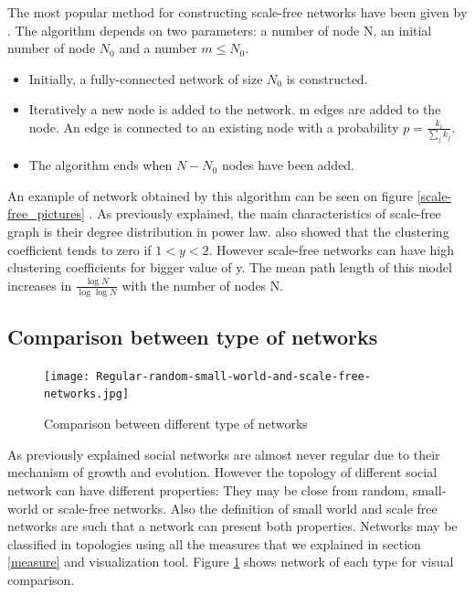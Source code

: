 \documentclass[a4paper, 12pt]{report}
\begin{document}
The most popular method for constructing scale-free networks have been given by \cite{barabasi_model}. The algorithm depends on two parameters: a number of node N, an initial number of node $N_0$ and a number $m \leq N_0$.\\
\begin{itemize}
\item Initially, a fully-connected network of size $N_0$ is constructed.
\item Iteratively a new node is added to the network. m edges are added to the node. An edge is connected to an existing node with a probability $p = \frac{k_i}{\sum_{j} k_j}$.
\item The algorithm ends when $N -N_0$ nodes have been added.
\end{itemize}
An example of network obtained by this algorithm can be seen on figure \ref{scale-free_pictures} . As previously explained, the main characteristics of scale-free graph is their degree distribution in power law. \cite{globalClustering2} also showed that the clustering coefficient tends to zero if $ 1 < y < 2$. However scale-free networks can have high clustering coefficients for bigger value of y. The mean path length of this model increases in $\frac{\log{N}}{\log{\log{N}}}$ with the number of nodes N.\\

\subsection{Comparison between type of networks}

\begin{figure}
\centering
\texttt{[image: Regular-random-small-world-and-scale-free-networks.jpg]}
\caption{Comparison between different type of networks \citep{img_comp}}
\label{comparison_networks}
\end{figure}

As previously explained social networks are almost never regular due to their mechanism of growth and evolution. However the topology of different social network can have different properties: They may be close from random, small-world or scale-free networks. Also the definition of small world and scale free networks are such that a network can present both properties. Networks may be classified in topologies using all the measures that we explained in section \ref{measure} and visualization tool. Figure \ref{comparison_networks} shows network of each type for visual comparison.
\end{document}
